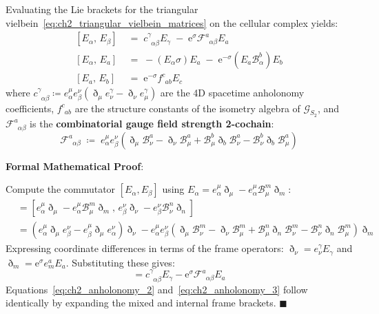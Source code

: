 \documentclass[
    12pt,
    a4paper,
    headings=normal,
    twoside=false,
    open=any,
    parskip=half
]{scrbook}
\newcommand{\ethop}{\eth}
\newcommand{\eu}{\mathrm{e}}
\newenvironment{myproof}[1][]{%
  \par\vspace{6pt}\noindent\textbf{\sffamily\color{maincolor}Formal Mathematical Proof\ifstrempty{#1}{}{ (#1)}}:\par\nopagebreak
}{%
  \penalty50\hfill\ensuremath{\blacksquare}\par\vspace{6pt}
}
\begin{document}
\begin{physlemma}\label{lem:ch2_anholonomy_coefficients}
Evaluating the Lie brackets for the triangular vielbein~\eqref{eq:ch2_triangular_vielbein_matrices} on the cellular complex yields:
\begin{align}
\left[ E_\alpha, \, E_\beta \right] &\;=\; c^\gamma_{\phantom{\gamma}\alpha\beta} E_\gamma \;-\; \eu^\sigma \mathcal{F}^a_{\phantom{a}\alpha\beta} E_a \label{eq:ch2_anholonomy_1} \\
\left[ E_\alpha, \, E_a \right] &\;=\; -\left( E_\alpha \sigma \right) E_a \;-\; \eu^{-\sigma} \left( E_a \mathcal{B}^b_\alpha \right) E_b \label{eq:ch2_anholonomy_2} \\
\left[ E_a, \, E_b \right] &\;=\; \eu^{-\sigma} f^c_{\phantom{c}ab} E_c \label{eq:ch2_anholonomy_3}
\end{align}
where $c^\gamma_{\phantom{\gamma}\alpha\beta} \coloneqq e_\alpha^\mu e_\beta^\nu (\ethop_\mu e_\nu^\gamma - \ethop_\nu e_\mu^\gamma)$ are the 4D spacetime anholonomy coefficients, $f^c_{\phantom{c}ab}$ are the structure constants of the isometry algebra of $\mathcal{G}_{S_2}$, and $\mathcal{F}^a_{\phantom{a}\alpha\beta}$ is the \textbf{combinatorial gauge field strength 2-cochain}:
\begin{equation}
\mathcal{F}^a_{\phantom{a}\alpha\beta} \;\coloneqq\; e_\alpha^\mu e_\beta^\nu \left( \ethop_\mu \mathcal{B}^a_\nu - \ethop_\nu \mathcal{B}^a_\mu + \mathcal{B}^b_\mu \ethop_b \mathcal{B}^a_\nu - \mathcal{B}^b_\nu \ethop_b \mathcal{B}^a_\mu \right)
\label{eq:ch2_gauge_field_strength_def}
\end{equation}
\end{physlemma}

\begin{myproof}
Compute the commutator $[E_\alpha, E_\beta]$ using $E_\alpha = e_\alpha^\mu \ethop_\mu - e_\alpha^\mu \mathcal{B}^m_\mu \ethop_m$:
\begin{align*}
[E_\alpha, E_\beta] &= \left[ e_\alpha^\mu \ethop_\mu - e_\alpha^\mu \mathcal{B}^m_\mu \ethop_m, \, e_\beta^\nu \ethop_\nu - e_\beta^\nu \mathcal{B}^n_\nu \ethop_n \right] \\
&= \left( e_\alpha^\mu \ethop_\mu e_\beta^\nu - e_\beta^\mu \ethop_\mu e_\alpha^\nu \right) \ethop_\nu - e_\alpha^\mu e_\beta^\nu \left( \ethop_\mu \mathcal{B}^m_\nu - \ethop_\nu \mathcal{B}^m_\mu + \mathcal{B}^n_\mu \ethop_n \mathcal{B}^m_\nu - \mathcal{B}^n_\nu \ethop_n \mathcal{B}^m_\mu \right) \ethop_m
\end{align*}
Expressing coordinate differences in terms of the frame operators: $\ethop_\nu = e_\nu^\gamma E_\gamma$ and $\ethop_m = \eu^\sigma e_m^a E_a$. Substituting these gives:
\begin{equation*}
[E_\alpha, E_\beta] = c^\gamma_{\phantom{\gamma}\alpha\beta} E_\gamma - \eu^\sigma \mathcal{F}^a_{\phantom{a}\alpha\beta} E_a
\end{equation*}
Equations~\eqref{eq:ch2_anholonomy_2} and~\eqref{eq:ch2_anholonomy_3} follow identically by expanding the mixed and internal frame brackets.
\end{myproof}
\end{document}
